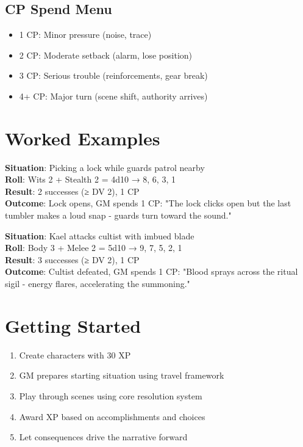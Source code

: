 \documentclass[11pt]{article}
\begin{document}
\subsection{CP Spend Menu}
\begin{itemize}
    \item 1 CP: Minor pressure (noise, trace)
    \item 2 CP: Moderate setback (alarm, lose position)
    \item 3 CP: Serious trouble (reinforcements, gear break)
    \item 4+ CP: Major turn (scene shift, authority arrives)
\end{itemize}

\section{Worked Examples}

\begin{examplebox}
\textbf{Situation}: Picking a lock while guards patrol nearby\\
\textbf{Roll}: Wits 2 + Stealth 2 = 4d10 → {8, 6, 3, 1}\\
\textbf{Result}: 2 successes (≥ DV 2), 1 CP\\
\textbf{Outcome}: Lock opens, GM spends 1 CP: "The lock clicks open but the last tumbler makes a loud snap - guards turn toward the sound."
\end{examplebox}

\begin{examplebox}
\textbf{Situation}: Kael attacks cultist with imbued blade\\
\textbf{Roll}: Body 3 + Melee 2 = 5d10 → {9, 7, 5, 2, 1}\\
\textbf{Result}: 3 successes (≥ DV 2), 1 CP\\
\textbf{Outcome}: Cultist defeated, GM spends 1 CP: "Blood sprays across the ritual sigil - energy flares, accelerating the summoning."
\end{examplebox}

\section{Getting Started}

\begin{enumerate}
    \item Create characters with 30 XP
    \item GM prepares starting situation using travel framework
    \item Play through scenes using core resolution system
    \item Award XP based on accomplishments and choices
    \item Let consequences drive the narrative forward
\end{enumerate}
\end{document}
